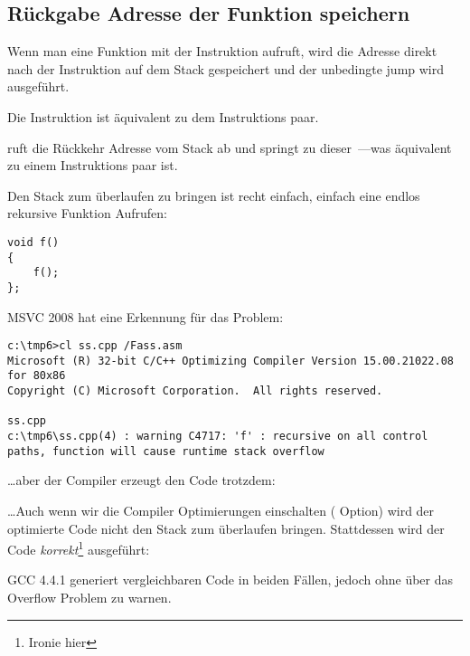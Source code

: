 \subsection{Rückgabe Adresse der Funktion speichern}


Wenn man eine Funktion mit der \CALL Instruktion aufruft, wird die Adresse direkt nach der
\CALL Instruktion auf dem Stack gespeichert und der unbedingte jump wird ausgeführt.

Die \CALL Instruktion ist äquivalent zu dem  Instruktions paar.

\RET ruft die Rückkehr Adresse vom Stack ab und springt zu dieser~---was äquivalent zu einem  Instruktions
paar ist.

\myindex{\Stack!\MLStackOverflow}
\myindex{\Recursion}

Den Stack zum überlaufen zu bringen ist recht einfach, einfach eine 
endlos rekursive Funktion Aufrufen:


\begin{lstlisting}[style=customc]
void f()
{
	f();
};
\end{lstlisting}


MSVC 2008 hat eine Erkennung für das Problem:


\begin{lstlisting}
c:\tmp6>cl ss.cpp /Fass.asm
Microsoft (R) 32-bit C/C++ Optimizing Compiler Version 15.00.21022.08 for 80x86
Copyright (C) Microsoft Corporation.  All rights reserved.

ss.cpp
c:\tmp6\ss.cpp(4) : warning C4717: 'f' : recursive on all control paths, function will cause runtime stack overflow
\end{lstlisting}

\dots aber der Compiler erzeugt den Code trotzdem:



\dots Auch wenn wir die Compiler Optimierungen einschalten ( Option) wird der optimierte Code nicht
den Stack zum überlaufen bringen. Stattdessen wird der Code \emph{korrekt}\footnote{Ironie hier} ausgeführt: 



GCC 4.4.1 generiert vergleichbaren Code in beiden Fällen, jedoch ohne über das Overflow Problem zu warnen.


